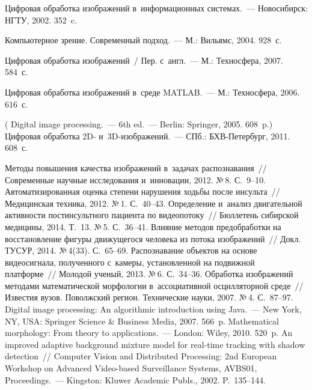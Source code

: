 \begin{multicols}{2}
{{\begin{thebibliography}{99}
 Цифровая обработка изоб\-ражений в~информационных системах.~--- Новосибирск: НГТУ, 2002. 352~c.

 Компьютерное зрение. Современный подход.~--- М.: Вильямс,
2004. 928~с.

 Цифровая обработка изображений~/ Пер. с~англ.~---
М.: Техносфера, 2007. 584~с.

 Цифровая обработка изображений в~среде MATLAB.~---
М.: Техносфера, 2006. 616~с.

( Digital image processing.~--- 6th ed.~---
 Berlin: Springer, 2005. 608~p.)
 Цифровая обработка 2D- и~3D-изображений.~---
СПб.: БХВ-Пе\-тер\-бург, 2011. 608~с.


Методы повышения качества изображений в~задачах распознавания~//
Современные научные исследования и~инновации, 2012. №\,8. С.~9--10.
Автоматизированная оценка степени
нарушения ходьбы после инсульта~// Медицинская техника, 2012. №\,1. С.~40--43.
Определение и~анализ двигательной активности постинсультного пациента по видеопотоку~//
Бюллетень сибирской медицины, 2014. Т.~13. №\,5. С.~36--41.
 Влияние методов пред\-об\-ра\-бот\-ки на восстановление
фигуры движущегося человека из потока изображений~// Докл. ТУСУР, 2014. №\,4(33).
С.~65--69.
 Распознавание объектов на основе видеосигнала,
полученного с~камеры, уста\-нов\-лен\-ной на подвижной платформе~// Молодой ученый, 2013.
№\,6. С.~34--36.
 Обработка изображений методами математической
морфологии в~ассоциативной осцилляторной среде~// Известия вузов. Поволжский регион.
Технические науки, 2007. №\,4. С.~87--97.
 Digital image processing: An algorithmic
introduction using Java.~---  New York, NY, USA:
Springer Science \& Business Media, 2007. 566~p.
 Mathematical morphology: From theory to applications.~---
London: Wiley, 2010. 520~p.
An improved adaptive background mixture model for real-time tracking
with shadow detection~// Computer
Vision and Distributed Processing:  2nd European Workshop on Advanced
Video-based Surveillance Systems, AVBS01, Proceedings.~---
Kingston: Kluwer Academic Publs., 2002. P.~135--144.
 \end{thebibliography}

 }
 }

\end{multicols}

